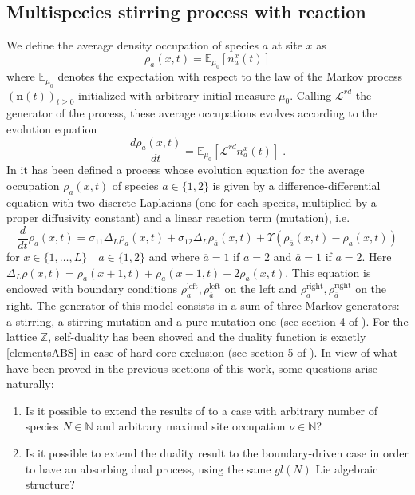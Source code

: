 \documentclass[10pt]{article}
\numberwithin{equation}{section}
\numberwithin{equation}{subsection}
\newcommand{\dt}{\;.}
\begin{document}
\subsection{Multispecies stirring process with reaction} \label{Subsection-RD}
We define the average density occupation of species $a$ at site $x$ as
\begin{equation}
	\rho_{a}(x,t)=\mathbb{E}_{\mu_{0}}\left[n_{a}^{x}(t)\right]
\end{equation}
where $\mathbb{E}_{\mu_{0}}$ denotes the expectation with respect to the law of the Markov process $(\bm{n}(t))_{t\geq 0}$ initialized with arbitrary initial measure $\mu_{0}$. Calling
$\mathcal{L}^{rd}$ the generator of the process, these average occupations evolves according to the evolution equation
\begin{equation}\label{EE-density}
	\frac{d \rho_{a}(x,t)}{dt}=\mathbb{E}_{\mu_{0}}\left[\mathcal{L}^{rd}n_{a}^{x}(t)\right]\dt
\end{equation} 
In \cite{casini2022uphill} it has been defined a process whose evolution equation for the average occupation $\rho_{a}(x,t)$ of species $a\in \{1,2\}$ is given by a difference-differential equation with two discrete Laplacians (one for each species, multiplied by a proper diffusivity constant) and a linear reaction term (mutation), i.e.
\begin{equation}\label{2SpeciesRD}
	\frac{d}{dt} \rho_{a}(x,t)=\sigma_{11}\Delta_{L}\rho_{a}(x,t)+\sigma_{12}\Delta_{L}\rho_{\overline{a}}(x,t)+\Upsilon\left(\rho_{\overline{a}}(x,t)-\rho_{a}(x,t)\right)
\end{equation} 
for $ x\in\{1,\ldots,L\}\quad a\in\{1,2\}$  and where $\overline{a}=1$ if $a=2$ and $\overline{a}=1$ if $a=2$. Here $\Delta_{L}\rho(x,t)=\rho_{a}(x+1,t)+\rho_{a}(x-1,t)-2\rho_{a}(x,t)$.
This equation is endowed with boundary conditions $\rho_{a}^{\text{left}},\rho_{\overline{a}}^{\text{left}}$ on the left and $\rho_{a}^{\text{right}},\rho_{\overline{a}}^{\text{right}}$ on the right. 
The generator of this model consists in a sum of three Markov generators: a stirring, a stirring-mutation and a pure mutation one (see section 4 of \cite{casini2022uphill}). For the lattice $\mathbb{Z}$, self-duality has been showed and the duality function is exactly \eqref{elementsABS} in case of hard-core exclusion (see section 5 of \cite{casini2022uphill}). In view of what have been proved in the previous sections of this work, some questions arise naturally:
\begin{enumerate}
		\item Is it possible to extend the results of \cite{casini2022uphill} to a case with arbitrary number of species $N\in \mathbb{N}$ and arbitrary maximal site occupation $\nu\in \mathbb{N}$?
			\item Is it possible to extend the duality result to the boundary-driven case in order to have an absorbing dual process, using the same ${gl}(N)$ Lie algebraic structure?
\end{enumerate}
\end{document}
